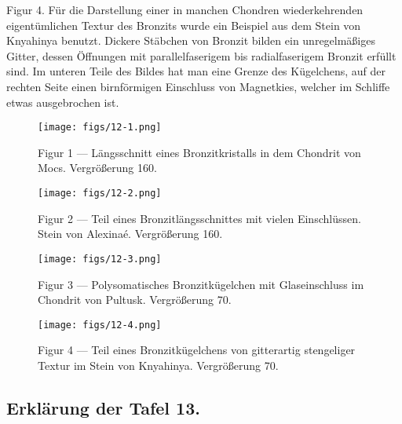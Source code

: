 \documentclass[a4paper, 12pt, oneside]{article}
\begin{document}
Figur 4. Für die Darstellung einer in manchen Chondren wiederkehrenden eigentümlichen Textur des Bronzits wurde ein Beispiel aus dem Stein von Knyahinya benutzt. Dickere Stäbchen von Bronzit bilden ein unregelmäßiges Gitter, dessen Öffnungen mit parallelfaserigem bis radialfaserigem Bronzit erfüllt sind. Im unteren Teile des Bildes hat man eine Grenze des Kügelchens, auf der rechten Seite einen birnförmigen Einschluss von Magnetkies, welcher im Schliffe etwas ausgebrochen ist.
\clearpage

\vspace*{\fill}
\begin{figure}[H]
\centering
\texttt{[image: figs/12-1.png]}
\caption{\small Figur 1 --- Längsschnitt eines Bronzitkristalls in dem Chondrit von Mocs. Vergrößerung 160.}
\end{figure}
\vspace*{\fill}
\clearpage

\vspace*{\fill}
\begin{figure}[H]
\centering
\texttt{[image: figs/12-2.png]}
\caption{\small Figur 2 --- Teil eines Bronzitlängsschnittes mit vielen Einschlüssen. Stein von Alexinaé. Vergrößerung 160.}
\end{figure}
\vspace*{\fill}
\clearpage

\vspace*{\fill}
\begin{figure}[H]
\centering
\texttt{[image: figs/12-3.png]}
\caption{\small Figur 3 --- Polysomatisches Bronzitkügelchen mit Glaseinschluss im Chondrit von Pultusk. Vergrößerung 70.}
\end{figure}
\vspace*{\fill}
\clearpage

\vspace*{\fill}
\begin{figure}[H]
\centering
\texttt{[image: figs/12-4.png]}
\caption{\small Figur 4 --- Teil eines Bronzitkügelchens von gitterartig stengeliger Textur im Stein von Knyahinya. Vergrößerung 70.}
\end{figure}
\vspace*{\fill}
\clearpage

\subsection{Erklärung der Tafel 13.}
\end{document}

